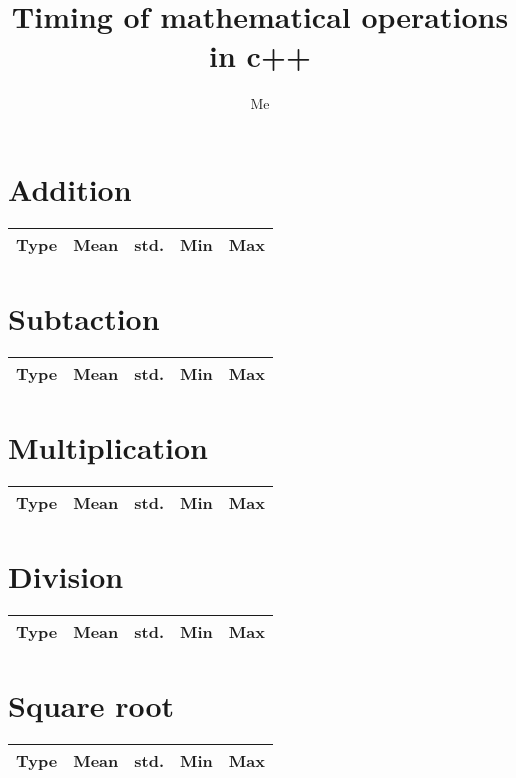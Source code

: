 \documentclass[a4paper]{article}
\title{Timing of mathematical operations in c++}
\author{Me}
\date{}
\begin{document}
  \maketitle

  \section{Addition}
  \begin{tabular}{||c|c|c|c|c||}
    \hline
    \textbf{Type}&\textbf{Mean}&\textbf{std.}&\textbf{Min}&\textbf{Max}\\
    \hline
    
  \end{tabular}


  \section{Subtaction}
  \begin{tabular}{||c|c|c|c|c||}
    \hline
    \textbf{Type}&\textbf{Mean}&\textbf{std.}&\textbf{Min}&\textbf{Max}\\
    \hline
    
  \end{tabular}


  \section{Multiplication}
  \begin{tabular}{||c|c|c|c|c||}
    \hline
    \textbf{Type}&\textbf{Mean}&\textbf{std.}&\textbf{Min}&\textbf{Max}\\
    \hline
    
  \end{tabular}


  \section{Division}
  \begin{tabular}{||c|c|c|c|c||}
    \hline
    \textbf{Type}&\textbf{Mean}&\textbf{std.}&\textbf{Min}&\textbf{Max}\\
    \hline
    
  \end{tabular}


  \section{Square root}
  \begin{tabular}{||c|c|c|c|c||}
    \hline
    \textbf{Type}&\textbf{Mean}&\textbf{std.}&\textbf{Min}&\textbf{Max}\\
    \hline
    
  \end{tabular}
\end{document}
